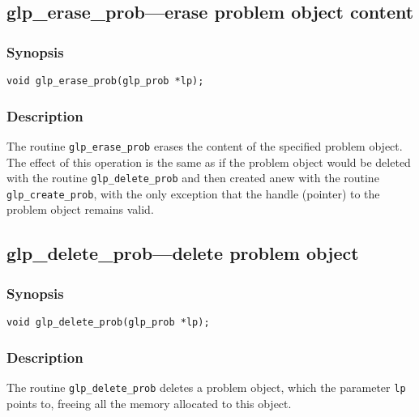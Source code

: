 \newpage

\subsection{glp\_erase\_prob---erase problem object content}

\subsubsection*{Synopsis}

\begin{verbatim}
void glp_erase_prob(glp_prob *lp);
\end{verbatim}

\subsubsection*{Description}

The routine \verb|glp_erase_prob| erases the content of the specified
problem object. The effect of this operation is the same as if the
problem object would be deleted with the routine \verb|glp_delete_prob|
and then created anew with the routine \verb|glp_create_prob|, with the
only exception that the handle (pointer) to the problem object remains
valid.

\subsection{glp\_delete\_prob---delete problem object}

\subsubsection*{Synopsis}

\begin{verbatim}
void glp_delete_prob(glp_prob *lp);
\end{verbatim}

\subsubsection*{Description}

The routine \verb|glp_delete_prob| deletes a problem object, which the
parameter \verb|lp| points to, freeing all the memory allocated to this
object.


\newpage


